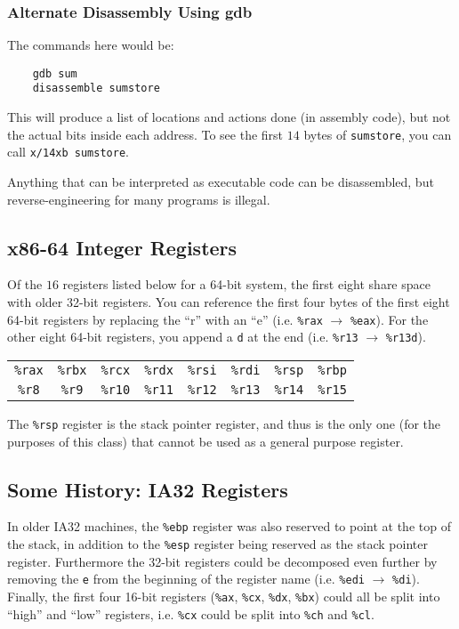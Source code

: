 \documentclass[class=article, crop=false]{standalone}
\begin{document}
  \subsubsection{Alternate Disassembly Using gdb}
  The commands here would be:
  \begin{verbatim}
    gdb sum
    disassemble sumstore
  \end{verbatim}
  This will produce a list of locations and actions done (in assembly code), but not the actual bits inside each address. To see the first $14$ bytes of \texttt{sumstore}, you can call \texttt{x/14xb sumstore}.
  \begin{note}{}
    Anything that can be interpreted as executable code can be disassembled, but reverse-engineering for many programs is illegal.
  \end{note}
  \subsection{x86-64 Integer Registers}
  Of the $16$ registers listed below for a 64-bit system, the first eight share space with older 32-bit registers. You can reference the first four bytes of the first eight 64-bit registers by replacing the ``r'' with an ``e'' (i.e. \texttt{\%rax} $\to$ \texttt{\%eax}). For the other eight 64-bit registers, you append a \texttt{d} at the end (i.e. \texttt{\%r13} $\to$ \texttt{\%r13d}).
  \begin{center}\begin{tabular}{cccccccc}
    \texttt{\%rax} & \texttt{\%rbx} & \texttt{\%rcx} & \texttt{\%rdx} & \texttt{\%rsi} & \texttt{\%rdi} & \texttt{\%rsp} & \texttt{\%rbp} \\
    \texttt{\%r8} & \texttt{\%r9} & \texttt{\%r10} & \texttt{\%r11} & \texttt{\%r12} & \texttt{\%r13} & \texttt{\%r14} & \texttt{\%r15}
  \end{tabular}\end{center}
  \begin{note}{}
    The \texttt{\%rsp} register is the stack pointer register, and thus is the only one (for the purposes of this class) that cannot be used as a general purpose register.
  \end{note}
  \subsection{Some History: IA32 Registers}
  In older IA32 machines, the \texttt{\%ebp} register was also reserved to point at the top of the stack, in addition to the \texttt{\%esp} register being reserved as the stack pointer register. Furthermore the 32-bit registers could be decomposed even further by removing the \texttt{e} from the beginning of the register name (i.e. \texttt{\%edi} $\to$ \texttt{\%di}). Finally, the first four 16-bit registers (\texttt{\%ax}, \texttt{\%cx}, \texttt{\%dx}, \texttt{\%bx}) could all be split into ``high'' and ``low'' registers, i.e. \texttt{\%cx} could be split into \texttt{\%ch} and \texttt{\%cl}.
\end{document}

